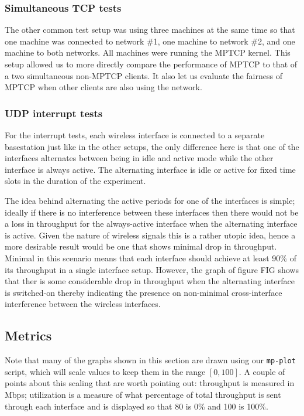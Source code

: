 \documentclass[12pt,a4paper]{article}
\begin{document}
\subsubsection{Simultaneous TCP tests}
The other common test setup was using three machines at the same time so that
one machine was connected to network \#1, one machine to network \#2, and one
machine to both networks. All machines were running the MPTCP kernel. This setup
allowed us to more directly compare the performance of MPTCP to that of a two
simultaneous non-MPTCP clients. It also let us evaluate the fairness of MPTCP
when other clients are also using the network.

\subsubsection{UDP interrupt tests}
For the interrupt tests, each wireless interface is connected to a separate
basestation just like in the other setups, the only difference here is that one
of the interfaces alternates between being in idle and active mode while the
other interface is always active. The alternating interface is idle or active
for fixed time slots in the duration of the experiment.

The idea behind alternating the active periods for one of the interfaces is
simple; ideally if there is no interference between these interfaces then there
would not be a loss in throughput for the always-active interface when the
alternating interface is active. Given the nature of wireless signals this is a
rather utopic idea, hence a more desirable result would be one that shows
minimal drop in throughput. Minimal in this scenario means that each interface
should achieve at least 90\% of its throughput in a single interface setup.
However, the graph of figure FIG shows that ther is some considerable drop in  %
throughput when the alternating interface is switched-on thereby indicating the
presence on non-minimal cross-interface interference between the wireless
interfaces.

\subsection{Metrics}
Note that many of the graphs shown in this section are drawn using our
\texttt{mp-plot} script, which will scale values to keep them in the range
$[0,100]$. A couple of points about this scaling that are worth pointing out:
throughput is measured in Mbps; utilization is a measure of what percentage of
total throughput is sent through each interface and is displayed so that 80 is
0\% and 100 is 100\%.
\end{document}
